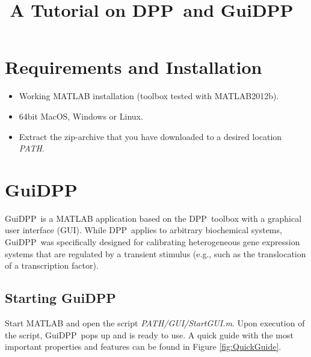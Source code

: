\documentclass[a4paper, 9pt]{scrartcl}
\begin{document}


\def\DPP{DPP~}
\def\GuiDPP{GuiDPP~}

\title{A Tutorial on \DPP and \GuiDPP}
\date{}
\maketitle



\tableofcontents

\newpage

\section{Requirements and Installation}

\begin{itemize}
	\item Working MATLAB installation (toolbox tested with MATLAB2012b).
	\item 64bit MacOS, Windows or Linux.
	\item Extract the zip-archive that you have downloaded to a desired location \textit{PATH}. 
\end{itemize}

\section{\GuiDPP}

\GuiDPP is a MATLAB application based on the \DPP toolbox with a graphical user interface (GUI). While \DPP applies to arbitrary biochemical systems, \GuiDPP was specifically designed for calibrating heterogeneous gene expression systems that are regulated by a transient stimulus (e.g., such as the translocation of a transcription factor).

\subsection{Starting \GuiDPP}

Start MATLAB and open the script \textit{PATH/GUI/StartGUI.m}. Upon execution of the script, \GuiDPP  pops up and is ready to use. A quick guide with the most important properties and features can be found in Figure \ref{fig:QuickGuide}.
\end{document}
